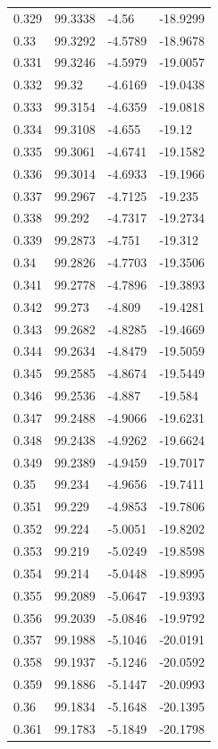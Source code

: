 \begin{tabular}{llll}
0.329 & 99.3338 & -4.56 & -18.9299 \\
0.33 & 99.3292 & -4.5789 & -18.9678 \\
0.331 & 99.3246 & -4.5979 & -19.0057 \\
0.332 & 99.32 & -4.6169 & -19.0438 \\
0.333 & 99.3154 & -4.6359 & -19.0818 \\
0.334 & 99.3108 & -4.655 & -19.12 \\
0.335 & 99.3061 & -4.6741 & -19.1582 \\
0.336 & 99.3014 & -4.6933 & -19.1966 \\
0.337 & 99.2967 & -4.7125 & -19.235 \\
0.338 & 99.292 & -4.7317 & -19.2734 \\
0.339 & 99.2873 & -4.751 & -19.312 \\
0.34 & 99.2826 & -4.7703 & -19.3506 \\
0.341 & 99.2778 & -4.7896 & -19.3893 \\
0.342 & 99.273 & -4.809 & -19.4281 \\
0.343 & 99.2682 & -4.8285 & -19.4669 \\
0.344 & 99.2634 & -4.8479 & -19.5059 \\
0.345 & 99.2585 & -4.8674 & -19.5449 \\
0.346 & 99.2536 & -4.887 & -19.584 \\
0.347 & 99.2488 & -4.9066 & -19.6231 \\
0.348 & 99.2438 & -4.9262 & -19.6624 \\
0.349 & 99.2389 & -4.9459 & -19.7017 \\
0.35 & 99.234 & -4.9656 & -19.7411 \\
0.351 & 99.229 & -4.9853 & -19.7806 \\
0.352 & 99.224 & -5.0051 & -19.8202 \\
0.353 & 99.219 & -5.0249 & -19.8598 \\
0.354 & 99.214 & -5.0448 & -19.8995 \\
0.355 & 99.2089 & -5.0647 & -19.9393 \\
0.356 & 99.2039 & -5.0846 & -19.9792 \\
0.357 & 99.1988 & -5.1046 & -20.0191 \\
0.358 & 99.1937 & -5.1246 & -20.0592 \\
0.359 & 99.1886 & -5.1447 & -20.0993 \\
0.36 & 99.1834 & -5.1648 & -20.1395 \\
0.361 & 99.1783 & -5.1849 & -20.1798 \\

\end{tabular}

